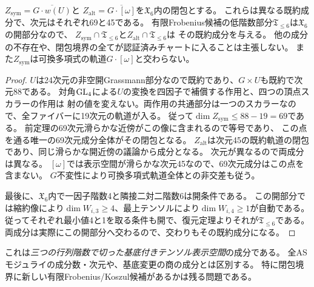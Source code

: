 \begin{corollary}[低階数表示空間の二つの既約成分]\label{cor:two-low-rank-presentation-components}
$Z_{\mathrm{sym}}=\overline{G\cdot w(U)}$と
$Z_{\mathrm{alt}}=\overline{G\cdot[\omega]}$を$\mathfrak X_6$内の閉包とする。
これらは異なる既約成分で、次元はそれぞれ69と45である。
有限Frobenius候補の低階数部分$\mathfrak T_{\leq6}$は$\mathfrak X_6$の開部分なので、
$Z_{\mathrm{sym}}\cap\mathfrak T_{\leq6}$と$Z_{\mathrm{alt}}\cap\mathfrak T_{\leq6}$は
その既約成分を与える。
他の成分の不存在や、閉包境界の全てが認証済みチャートに入ることは主張しない。
また$Z_{\mathrm{sym}}$は可換多項式の軌道$G\cdot[\omega]$と交わらない。
\end{corollary}
\begin{proof}
$U$は24次元の非空開Grassmann部分なので既約であり、$G\times U$も既約で次元88である。
対角$\operatorname{GL}_4$による$U$の変換を四因子で補償する作用と、四つの頂点スカラーの作用は
射の値を変えない。両作用の共通部分は一つのスカラーなので、全ファイバーに19次元の軌道が入る。
従って$\dim Z_{\mathrm{sym}}\leq88-19=69$である。
前定理の69次元滑らかな近傍がこの像に含まれるので等号であり、
この点を通る唯一の69次元成分全体がその閉包となる。
$Z_{\mathrm{alt}}$は次元45の既約軌道の閉包であり、同じ滑らかな開近傍の議論から成分となる。
次元が異なるので両成分は異なる。
$[\omega]$では表示空間が滑らかな次元45なので、69次元成分はこの点を含まない。
$G$不変性により可換多項式軌道全体との非交差も従う。

最後に、$\mathfrak X_6$内で一因子階数4と隣接二対二階数6は開条件である。
この開部分では縮約像により$\dim W_{i,3}\geq4$、最上テンソルにより$\dim W_{i,4}\geq1$が自動である。
従ってそれぞれ最小値4と1を取る条件も開で、復元定理よりそれが$\mathfrak T_{\leq6}$である。
両成分は実際にこの開部分へ交わるので、交わりもその既約成分になる。
\end{proof}
\begin{remark}
これは\emph{三つの行列階数で切った基底付きテンソル表示空間}の成分である。
全ASモジュライの成分数・次元や、基底変更の商の成分とは区別する。
特に閉包境界に新しい有限Frobenius/Koszul候補があるかは残る問題である。
\end{remark}

